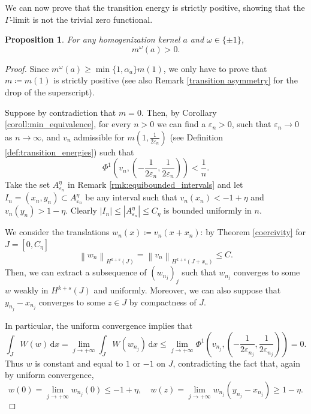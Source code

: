 \documentclass{article}
\newtheorem{Proposition}[Theorem]{Proposition}
\theoremstyle{definition}
\newcommand{\norm}[1]{\left\lVert #1 \right\rVert}
\newcommand{\de}{\mathrm{d}}
\newcommand{\e}{\varepsilon}
\def\e{\varepsilon}
\begin{document}
We can now prove that the transition energy is strictly positive, showing that the $\Gamma$-limit is not the trivial zero functional.
\begin{Proposition}\label{prop:positivity_of_transition_energies}
    For any homogenization kernel $a$ and $\omega\in \{\pm 1\}$, $$m^\omega(a) >0.$$
\end{Proposition}
\begin{proof}
    Since $m^\omega(a) \geq \min\{1,\alpha_a\}m(1)$, we only have to prove that $m\coloneqq m(1)$ is strictly positive (see also Remark \ref{transition asymmetry} for the drop of the superscript). 
    
    Suppose by contradiction that $m=0$. Then, by Corollary \ref{coroll:min_equivalence}, for every $n>0$ we can find a $\e_n>0$, such that $\e_n\to 0$ as $n \to \infty$, 
    and $v_n$ admissible for $m\left(1,\frac{1}{2\e_n}\right)$ (see Definition \ref{def:transition_energies}) such that
    \begin{equation*}
    \Phi^1\left(v_n, \left(-\frac{1}{2\e_n},\frac{1}{2\e_n}\right)\right) < \frac{1}{n}.
    \end{equation*}
    Take the set $A_{\e_n}^\eta$  in Remark \ref{rmk:equibounded_intervals} and let $I_n=(x_n,y_n) \subset A_{\e_n}^\eta$ be any interval such that $v_n(x_n)< -1+\eta$ and $v_n(y_n)> 1-\eta$. Clearly $|I_n|\leq |A^\eta_{\e_n}|\leq C_\eta$ is bounded uniformly in $n$. 
    
    We consider the translations $w_n(x) \coloneqq v_n(x+x_n)$:  by Theorem \ref{coercivity} for  $J=[0,C_\eta]$
    \[\norm{w_{n}}_{H^{k+s}(J)} = \norm{v_n}_{H^{k+s}(J+x_n)} \leq C.\]
     Then, we can extract a subsequence of $(w_{n_j})_{j}$ such that $w_{n_j}$ converges to some $w$ weakly in $H^{k+s}(J)$ and uniformly. Moreover, we can also suppose that $y_{n_j}-x_{n_j}$ converges to some $z\in J$ by compactness of $J$.
     
     In particular, the uniform convergence  implies that
    \[\int_J W(w)\,\de x = \lim_{j \rightarrow +\infty} \int_J W(w_{n_j})\,\de x \leq \lim_{j\rightarrow +\infty}\Phi^1\left(v_{n_j}, \left(-\frac{1}{2\e_{n_j}},\frac{1}{2\e_{n_j}}\right)\right) = 0.\]
    Thus $w$ is constant and equal to $1$ or $-1$ on $J$, contradicting the fact that, again by uniform convergence,
    \[w(0)=\lim_{j\to +\infty} w_{n_j}(0) \leq -1+\eta,\quad w(z)=\lim_{j\to +\infty} w_{n_j}(y_{n_j}-x_{n_j})\geq 1-\eta.\]
\end{proof}
\end{document}
